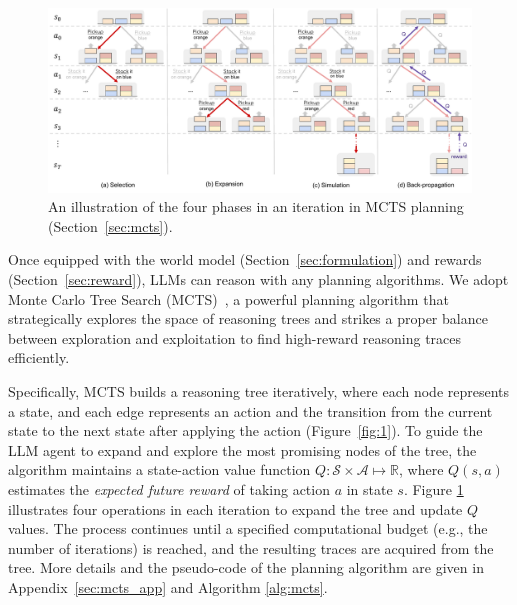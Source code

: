 \begin{figure}[t]
    \centering
    \includegraphics[width=\textwidth]{sections/mcts_phases.pdf}
    \vspace{-25pt}
    \caption{An illustration of the four phases in an iteration in MCTS planning (Section~\ref{sec:mcts}).}
    \label{fig:mcts_phases}
    \vspace{-12pt}
\end{figure}


Once equipped with the world model (Section~\ref{sec:formulation}) and rewards (Section~\ref{sec:reward}), LLMs can reason with any planning algorithms. We adopt Monte Carlo Tree Search (MCTS)~\cite{kocsis2006bandit, coulom2007efficient}, a powerful planning algorithm that strategically explores the space of reasoning trees and strikes a proper balance between exploration and exploitation to find high-reward reasoning traces efficiently. 

Specifically, MCTS builds a reasoning tree iteratively, where each node represents a state, and each edge represents an action and the transition from the current state to the next state after applying the action (Figure~\ref{fig:1}). 
To guide the LLM agent to expand and explore the most promising nodes of the tree, the algorithm maintains a state-action value function $Q : \mathcal S \times \mathcal A \mapsto \mathbb R$, where $Q(s, a)$ estimates the \emph{expected future reward} of taking action $a$ in state $s$. Figure \ref{fig:mcts_phases} illustrates four operations in each iteration to expand the tree and update $Q$ values. The process continues until a specified computational budget (e.g., the number of iterations) is reached, and the resulting traces are acquired from the tree. More details and the pseudo-code of the planning algorithm are given in Appendix~\ref{sec:mcts_app} and Algorithm \ref{alg:mcts}.




